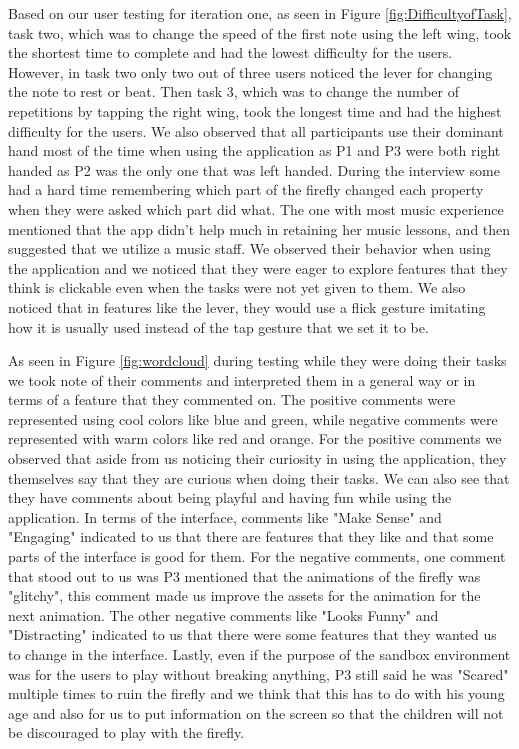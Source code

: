 Based on our user testing for iteration one, as seen in Figure \ref{fig:DifficultyofTask}, task two, which was to change the speed of the first note using the left wing, took the shortest time to complete and had the lowest difficulty for the users. However, in task two only two out of three users noticed the lever for changing the note to rest or beat. Then task 3, which was to change the number of repetitions by tapping the right wing, took the longest time and had the highest difficulty for the users. We also observed that all participants use their dominant hand most of the time when using the application as P1 and P3 were both right handed as P2 was the only one that was left handed. During the interview some had a hard time remembering which part of the firefly changed each property when they were asked which part did what. The one with most music experience mentioned that the app didn't help much in retaining her music lessons, and then suggested that we utilize a music staff. We observed their behavior when using the application and we noticed that they were eager to explore features that they think is clickable even when the tasks were not yet given to them. We also noticed that in features like the lever, they would use a flick gesture imitating how it is usually used instead of the tap gesture that we set it to be. 

 As seen in Figure \ref{fig:wordcloud} during testing while they were doing their tasks we took note of their comments and interpreted them in a general way or in terms of a feature that they commented on. The positive comments were represented using cool colors like blue and green, while negative comments were represented with warm colors like red and orange. For the positive comments we observed that aside from us noticing their curiosity in using the application, they themselves say that they are curious when doing their tasks. We can also see that they have comments about being playful and having fun while using the application. In terms of the interface, comments like "Make Sense" and "Engaging" indicated to us that there are features that they like and that some parts of the interface is good for them. For the negative comments, one comment that stood out to us was P3 mentioned that the animations of the firefly was "glitchy", this comment made us improve the assets for the animation for the next animation. The other negative comments like "Looks Funny" and "Distracting" indicated to us that there were some features that they wanted us to change in the interface. Lastly, even if the purpose of the sandbox environment was for the users to play without breaking anything, P3 still said he was "Scared" multiple times to ruin the firefly and we think that this has to do with his young age and also for us to put information on the screen so that the children will not be discouraged to play with the firefly.